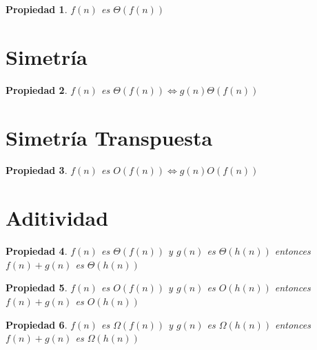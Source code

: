 \documentclass[hidelinks]{article}
\newcommand\Omicron{O}
\newtheorem{propiedad}{Propiedad}[section]
\begin{document}
\begin{propiedad}
  $f(n)$ es $\Theta(f(n))$
\end{propiedad}

\section{Simetría}
\begin{propiedad}
  $f(n)$ es $\Theta(f(n)) \Leftrightarrow g(n) \Theta(f(n))$
\end{propiedad}

\section{Simetría Transpuesta}
\begin{propiedad}
  $f(n)$ es $\Omicron(f(n)) \Leftrightarrow g(n) \Omicron(f(n))$
\end{propiedad}

\section{Aditividad}
\begin{propiedad}
  $f(n)$ es $\Theta(f(n))$ y $g(n)$ es $\Theta(h(n))$ entonces $f(n) + g(n)$ es $\Theta(h(n))$
\end{propiedad}

\begin{propiedad}
  $f(n)$ es $\Omicron(f(n))$ y $g(n)$ es $\Omicron(h(n))$ entonces $f(n) + g(n)$ es $\Omicron(h(n))$
\end{propiedad}

\begin{propiedad}
  $f(n)$ es $\Omega(f(n))$ y $g(n)$ es $\Omega(h(n))$ entonces $f(n) + g(n)$ es $\Omega(h(n))$
\end{propiedad}
\end{document}
